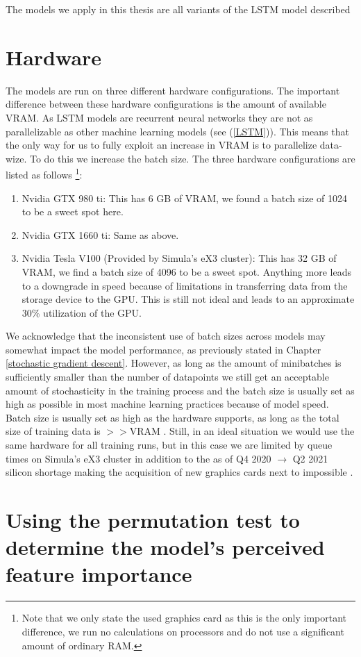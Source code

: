 The models we apply in this thesis are all variants of the LSTM model described 
\section{Hardware}
The models are run on three different hardware configurations. The important difference 
between these hardware configurations is the amount of available VRAM. As LSTM models 
are recurrent neural networks they are not as parallelizable as other machine learning 
models (see (\ref{LSTM})). This means that the only way for us to fully exploit 
an increase in VRAM is to parallelize data-wize. To do this we increase the batch size.
The three hardware configurations are listed as follows \footnote{Note that we only 
state the used graphics card as this is the only important difference, we run no 
calculations on processors and do not use a significant amount of ordinary RAM.}:
\begin{enumerate}
    \item Nvidia GTX 980 ti: This has 6 GB of VRAM, we found a batch size of 1024 
        to be a sweet spot here.
    \item Nvidia GTX 1660 ti: Same as above.
    \item Nvidia Tesla V100 (Provided by Simula's eX3 cluster): This has 32 GB of VRAM, we find a batch size of 4096 
        to be a sweet spot. Anything more leads to a downgrade in speed because 
        of limitations in transferring data from the storage device to the GPU. 
        This is still not ideal and leads to an approximate 30\% utilization of the 
        GPU.
\end{enumerate}
We acknowledge that the inconsistent use of batch sizes across models may somewhat 
impact the model performance, as previously stated in Chapter \ref{stochastic gradient descent}.
However, as long as the amount of minibatches is sufficiently smaller than the number of datapoints we 
still get an acceptable amount of stochasticity in the training process and the batch 
size is usually set as high as possible in most machine learning practices because 
of model speed. Batch size is usually set as high as the hardware supports, as long 
as the total size of training data is $>>$VRAM \citationneeded.
Still, in an ideal situation we would use the same hardware for all training runs, 
but in this case we are limited by queue times on Simula's eX3 cluster in addition 
to the as of Q4 2020 $\rightarrow$ Q2 2021 silicon shortage making the acquisition of 
new graphics cards next to impossible \citep{GPUShortage}.
\section{Using the permutation test to determine the model's perceived feature importance}
